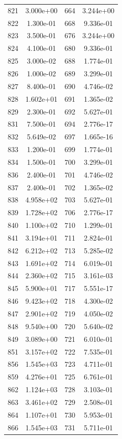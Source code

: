 \documentclass[12pt]{article}
\begin{document}
\begin{longtable}{@{}cccc@{}}
821 & 3.000e+00 & 664 & 3.244e+00 \\
822 & 1.300e-01 & 668 & 9.336e-01 \\
823 & 3.500e-01 & 676 & 3.244e+00 \\
824 & 4.100e-01 & 680 & 9.336e-01 \\
825 & 3.000e-02 & 688 & 1.774e-01 \\
826 & 1.000e-02 & 689 & 3.299e-01 \\
827 & 8.400e-01 & 690 & 4.746e-02 \\
828 & 1.602e+01 & 691 & 1.365e-02 \\
829 & 2.300e-01 & 692 & 5.627e-01 \\
831 & 7.500e-01 & 694 & 2.776e-17 \\
832 & 5.649e-02 & 697 & 1.665e-16 \\
833 & 1.200e-01 & 699 & 1.774e-01 \\
834 & 1.500e-01 & 700 & 3.299e-01 \\
836 & 2.400e-01 & 701 & 4.746e-02 \\
837 & 2.400e-01 & 702 & 1.365e-02 \\
838 & 4.958e+02 & 703 & 5.627e-01 \\
839 & 1.728e+02 & 706 & 2.776e-17 \\
840 & 1.100e+02 & 710 & 1.299e-01 \\
841 & 3.194e+01 & 711 & 2.824e-01 \\
842 & 6.212e+02 & 713 & 5.285e-02 \\
843 & 1.691e+02 & 714 & 6.019e-01 \\
844 & 2.360e+02 & 715 & 3.161e-03 \\
845 & 5.900e+01 & 717 & 5.551e-17 \\
846 & 9.423e+02 & 718 & 4.300e-02 \\
847 & 2.901e+02 & 719 & 4.050e-02 \\
848 & 9.540e+00 & 720 & 5.640e-02 \\
849 & 3.089e+00 & 721 & 6.010e-01 \\
851 & 3.157e+02 & 722 & 7.535e-01 \\
856 & 1.545e+03 & 723 & 4.711e-01 \\
859 & 4.276e+01 & 725 & 6.761e-01 \\
862 & 1.124e+03 & 728 & 3.103e-01 \\
863 & 3.461e+02 & 729 & 2.508e-01 \\
864 & 1.107e+01 & 730 & 5.953e-01 \\
866 & 1.545e+03 & 731 & 5.711e-01 \\

\end{longtable}
\end{document}
